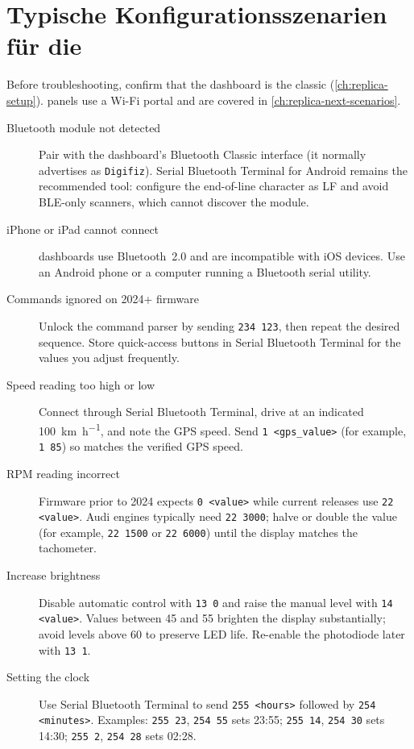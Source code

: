 \chapter{Typische Konfigurationsszenarien für die \ReplicaGenOne{}}\label{ch:replica-scenarios}

Before troubleshooting, confirm that the dashboard is the classic \ReplicaGenOne{} (\autoref{ch:replica-setup}). \ReplicaNextLong{} panels use a Wi-Fi portal and are covered in \autoref{ch:replica-next-scenarios}.

\begin{description}
    \item[Bluetooth module not detected] Pair with the dashboard's Bluetooth Classic interface (it normally advertises as \texttt{Digifiz}). Serial Bluetooth Terminal for Android remains the recommended tool: configure the end-of-line character as LF and avoid BLE-only scanners, which cannot discover the module.
    \item[iPhone or iPad cannot connect] \ReplicaGenOneShort{} dashboards use Bluetooth~2.0 and are incompatible with iOS devices. Use an Android phone or a computer running a Bluetooth serial utility.
    \item[Commands ignored on 2024+ firmware] Unlock the command parser by sending \verb|234 123|, then repeat the desired sequence. Store quick-access buttons in Serial Bluetooth Terminal for the values you adjust frequently.
    \item[Speed reading too high or low] Connect through Serial Bluetooth Terminal, drive at an indicated \SI{100}{\kilo\metre\per\hour}, and note the GPS speed. Send \verb|1 <gps_value>| (for example, \verb|1 85|) so  matches the verified GPS speed.
    \item[RPM reading incorrect] Firmware prior to 2024 expects \verb|0 <value>| while current releases use \verb|22 <value>|. Audi engines typically need \verb|22 3000|; halve or double the value (for example, \verb|22 1500| or \verb|22 6000|) until the display matches the tachometer.
    \item[Increase brightness] Disable automatic control with \verb|13 0| and raise the manual level with \verb|14 <value>|. Values between 45 and 55 brighten the display substantially; avoid levels above 60 to preserve LED life. Re-enable the photodiode later with \verb|13 1|.
    \item[Setting the clock] Use Serial Bluetooth Terminal to send \verb|255 <hours>| followed by \verb|254 <minutes>|. Examples: \verb|255 23|, \verb|254 55| sets 23:55; \verb|255 14|, \verb|254 30| sets 14:30; \verb|255 2|, \verb|254 28| sets 02:28.

\end{description}
